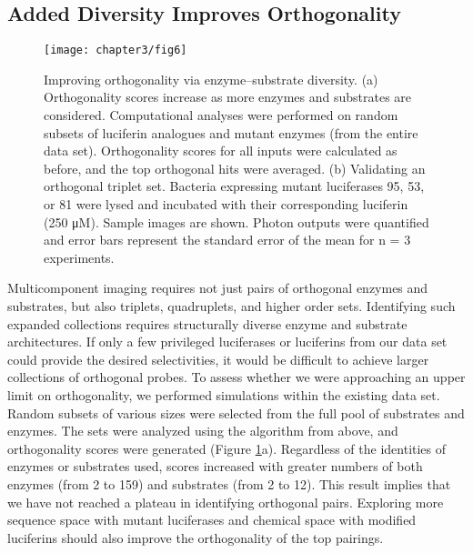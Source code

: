 \subsection*{Added Diversity Improves Orthogonality}
\begin{figure}[htbp]
\texttt{[image: chapter3/fig6]}
\centering
\caption[Improving orthogonality via enzyme–substrate diversity]{Improving orthogonality via enzyme–substrate diversity. (a) Orthogonality scores increase as more enzymes and substrates are considered. Computational analyses were performed on random subsets of luciferin analogues and mutant enzymes (from the entire data set). Orthogonality scores for all inputs were calculated as before, and the top orthogonal hits were averaged. (b) Validating an orthogonal triplet set. Bacteria expressing mutant luciferases 95, 53, or 81 were lysed and incubated with their corresponding luciferin (250 μM). Sample images are shown. Photon outputs were quantified and error bars represent the standard error of the mean for n = 3 experiments.}
  \label{fig:surface}
\end{figure}
Multicomponent imaging requires not just pairs of orthogonal enzymes and substrates, but also triplets, quadruplets, and higher order sets. Identifying such expanded collections requires structurally diverse enzyme and substrate architectures. If only a few privileged luciferases or luciferins from our data set could provide the desired selectivities, it would be difficult to achieve larger collections of orthogonal probes. To assess whether we were approaching an upper limit on orthogonality, we performed simulations within the existing data set. Random subsets of various sizes were selected from the full pool of substrates and enzymes. The sets were analyzed using the algorithm from above, and orthogonality scores were generated (Figure \ref{fig:surface}a). Regardless of the identities of enzymes or substrates used, scores increased with greater numbers of both enzymes (from 2 to 159) and substrates (from 2 to 12). This result implies that we have not reached a plateau in identifying orthogonal pairs. Exploring more sequence space with mutant luciferases and chemical space with modified luciferins should also improve the orthogonality of the top pairings.
\par
